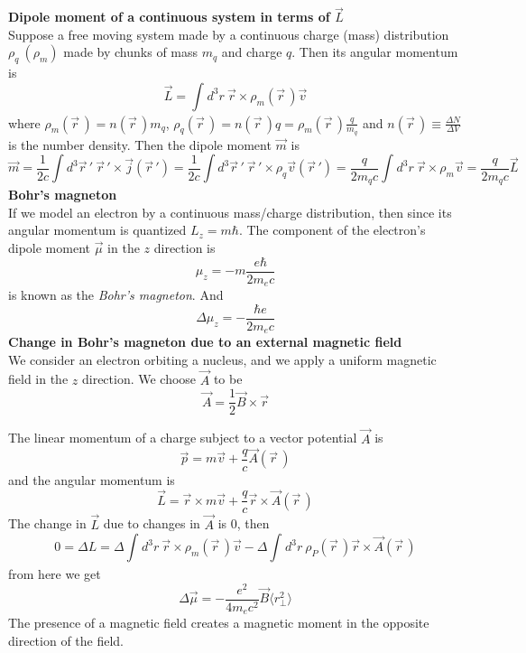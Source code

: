 \documentclass[12pt,a4paper]{article}
\newcommand{\integral}[3]{\int_{#1}^{#2} d #3 \ } %
\begin{document}
\textbf{Dipole moment of a continuous system in terms of $\vec{L}$}\\
Suppose a free moving system made by a continuous charge (mass) distribution $\rho_q \ (\rho_m)$ made by chunks of mass $m_q$ and charge $q$. Then its angular momentum is
\begin{equation}
	\vec{L} = \integral{}{}{^3r} \vec{r} \times \rho_m(\vec{r}\,) \vec{v}
	\end{equation}
where $\rho_m(\vec{r}\,) = n(\vec{r}\,)m_q$, $\rho_q(\vec{r}\,) = n(\vec{r}\,)q = \rho_m(\vec{r}\,) \frac{q}{m_q}$ and $n(\vec{r}\,) \equiv \frac{\Delta N}{\Delta V}$ is the number density. Then the dipole moment $\vec{m}$ is
\begin{equation}
	\vec{m} = \frac{1}{2c} \int d^3 \vec{r}\,' \ \vec{r}\,'\times \vec{j}(\vec{r}\, ') = \frac{1}{2c} \int d^3 \vec{r}\,' \ \vec{r}\,'\times \rho_q\vec{v}(\vec{r}\, ') = \frac{q}{2m_qc}\integral{}{}{^3r} \vec{r}\times \rho_m \vec{v} = \frac{q}{2m_qc} \vec{L}
\end{equation}
\textbf{Bohr's magneton}\\
If we model an electron by a continuous mass/charge distribution, then since its angular momentum is quantized $L_z = m\hbar$. The component of the electron's dipole moment $\vec{\mu}$ in the $z$ direction is
\begin{equation}
	\mu_z = -m \frac{e\hbar}{2m_e c}
\end{equation}
is known as the \textit{Bohr's magneton}. And
\begin{equation}
\Delta \mu_z = -\frac{\hbar e}{2m_e c}
\end{equation}
\textbf{Change in Bohr's magneton due to an external magnetic field}\\
We consider an electron orbiting a nucleus, and we apply a uniform magnetic field in the $z$ direction. We choose $ \vec{A}$ to be
\begin{equation}
	\vec{A} = \frac{1}{2} \vec{B} \times  \vec{r}
\end{equation}

The linear momentum of a charge subject to a vector potential $\vec{A}$ is
\begin{equation}
	\vec{p} = m\vec{v} + \frac{q}{c} \vec{A}(\vec{r}\,)
\end{equation}
and the angular momentum is
\begin{equation}
	\vec{L} = \vec{r}\times m\vec{v} + \frac{q}{c} \vec{r}\times\vec{A}(\vec{r}\,)
\end{equation}
The change in $\vec{L}$ due to changes in $\vec{A}$ is 0, then
\begin{equation}
	0 = \Delta L = \Delta \integral{}{}{^3r} \vec{r} \times \rho_m(\vec{r}\,) \vec{v} -\Delta \integral{}{}{^3r} \rho_P(\vec{r}\,)\vec{r}\times \vec{A}(\vec{r}\,)
\end{equation}
from here we get
\begin{equation}
	\Delta \vec{\mu} = -\frac{e^2}{4m_e c^2} \vec{B}\langle r_{\perp}^2 \rangle
\end{equation}
The presence of a magnetic field creates a magnetic moment in the opposite direction of the field.
\end{document}
